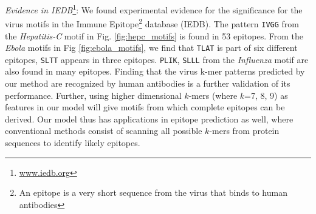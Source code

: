 \documentclass[a4paper,11pt]{article}
\begin{document}
\noindent\emph{Evidence in IEDB}\footnote{\url{www.iedb.org}}:
We found experimental evidence for the significance for the virus motifs in the Immune Epitope\footnote{An epitope is a very short sequence from the virus that binds to human antibodies} database (IEDB).
The pattern \texttt{IVGG} from the \textit{Hepatitis-C} motif in Fig. \ref{fig:hepc_motifs} is found in 53 epitopes.
From the \textit{Ebola} motifs in Fig \ref{fig:ebola_motifs}, we find that \texttt{TLAT} is part of six different epitopes, \texttt{SLTT} appears in three epitopes. \texttt{PLIK}, \texttt{SLLL} from the \textit{Influenza} motif are also found in many epitopes.
Finding that the virus k-mer patterns predicted by our method are recognized by human antibodies
is a further validation of its performance.
Further, using higher dimensional $k$-mers (where $k$=7, 8, 9) as
features in our model will give motifs from which complete epitopes can be derived. %
Our model thus has applications in epitope prediction as well, where conventional methods consist of scanning all possible $k$-mers from protein sequences to identify likely epitopes.
\end{document}

